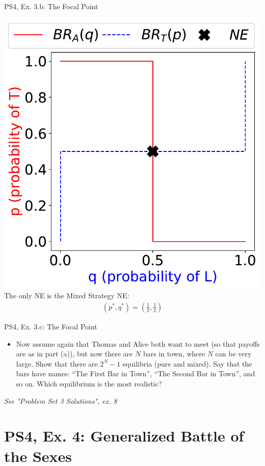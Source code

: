\begin{frame}{PS4, Ex. 3.b: The Focal Point}
\begin{multicols}{2}
    \includegraphics[width=\columnwidth]{figures/3b}
    The only NE is the Mixed Strategy NE:
    \begin{align*}
      (p^{*},q^{*})=\left(\frac{1}{2},\frac{1}{2}\right)
    \end{align*}
  \vfill\null
  \end{multicols}
\end{frame}
\begin{frame}{PS4, Ex. 3.c: The Focal Point}
  \begin{multicols}{2}
    \begin{itemize}
      \item[(c)] Now assume again that Thomas and Alice both want to meet (so that payoffs are as in part (a)), but now there are $N$ bars in town, where $N$ can be very large. Show that there are $2^N-1$ equilibria (pure and mixed). Say that the bars have names: “The First Bar in Town”, “The Second Bar in Town”, and so on. Which equilibrium is the most realistic?
    \end{itemize}
  \vfill\null \columnbreak
    \textit{See "Problem Set 3 Solutions", ex. 8}
  \vfill\null
  \end{multicols}
\end{frame}


\section{PS4, Ex. 4: Generalized Battle of the Sexes}


